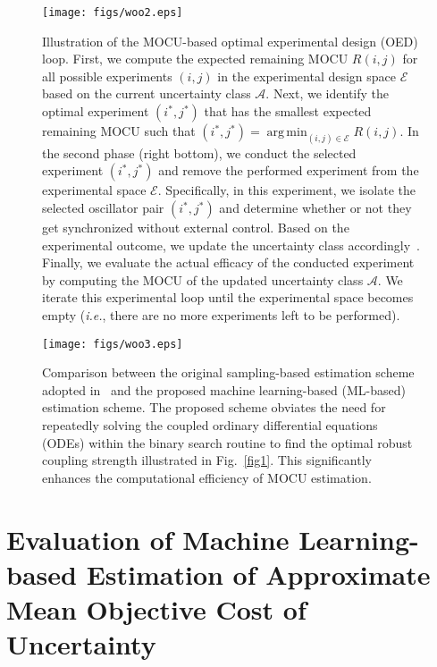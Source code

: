 \documentclass{article}
\DeclareMathOperator*{\argmin}{arg\,min}
\begin{document}
\begin{figure*}
\centering
\texttt{[image: figs/woo2.eps]}
\caption{Illustration of the MOCU-based optimal experimental design (OED) loop. First, we compute the expected remaining MOCU ${R \left( i,j\right)}$ for all possible experiments ${\left(i, j\right)}$ in the experimental design space $\mathbf{\mathcal{E}}$ based on the current uncertainty class $\mathbf{\mathcal{A}}$. Next, we identify the optimal experiment ${\left(i^\ast, j^\ast\right)}$ that has the smallest expected remaining MOCU such that ${\left(i^\ast, j^\ast\right)=\argmin_{\left(i,j\right)\in\mathbf{\mathcal{E}}} R\left(i,j\right)}$. In the second phase (right bottom), we conduct the selected experiment ${\left(i^\ast, j^\ast\right)}$ and remove the performed experiment from the experimental space $\mathbf{\mathcal{E}}$. Specifically, in this experiment, we isolate the selected oscillator pair ${\left(i^\ast, j^\ast\right)}$ and determine whether or not they get synchronized without external control. Based on the experimental outcome, we update the uncertainty class accordingly~\cite{Hong2021}. Finally, we evaluate the actual efficacy of the conducted experiment by computing the MOCU of the updated uncertainty class $\mathbf{\mathcal{A}}$. We iterate this experimental loop until the experimental space becomes empty (\textit{i.e.}, there are no more experiments left to be performed).}
\label{fig2}
\end{figure*}
\begin{figure*}
\centering
\texttt{[image: figs/woo3.eps]}
\caption{Comparison between the original sampling-based estimation scheme adopted in~\cite{Hong2021} and the proposed machine learning-based (ML-based) estimation scheme. The proposed scheme obviates the need for repeatedly solving the coupled ordinary differential equations (ODEs) within the binary search routine to find the optimal robust coupling strength illustrated in Fig.~\ref{fig1}. This significantly enhances the computational efficiency of MOCU estimation.}
\label{fig3}
\end{figure*}

\section{Evaluation of Machine Learning-based Estimation of Approximate Mean Objective Cost of Uncertainty}
\label{sec:mocu_ml}
\end{document}
